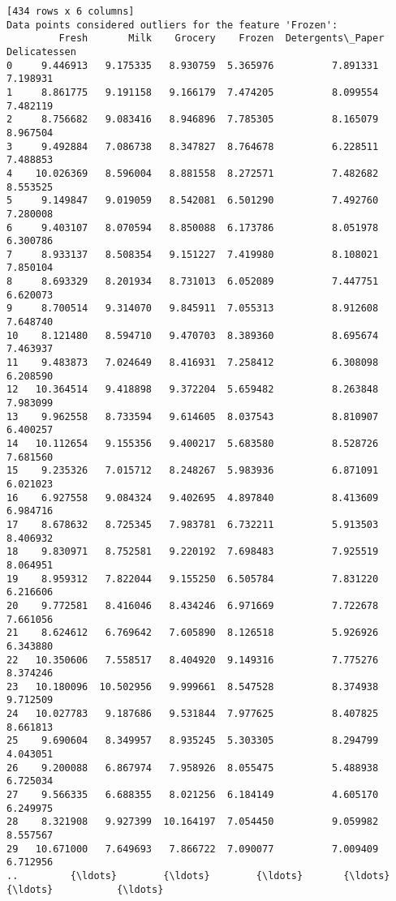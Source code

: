 \documentclass[11pt]{article}
\begin{document}
\begin{Verbatim}[commandchars=\\\{\}]
[434 rows x 6 columns]
Data points considered outliers for the feature 'Frozen':
         Fresh       Milk    Grocery    Frozen  Detergents\_Paper  Delicatessen
0     9.446913   9.175335   8.930759  5.365976          7.891331      7.198931
1     8.861775   9.191158   9.166179  7.474205          8.099554      7.482119
2     8.756682   9.083416   8.946896  7.785305          8.165079      8.967504
3     9.492884   7.086738   8.347827  8.764678          6.228511      7.488853
4    10.026369   8.596004   8.881558  8.272571          7.482682      8.553525
5     9.149847   9.019059   8.542081  6.501290          7.492760      7.280008
6     9.403107   8.070594   8.850088  6.173786          8.051978      6.300786
7     8.933137   8.508354   9.151227  7.419980          8.108021      7.850104
8     8.693329   8.201934   8.731013  6.052089          7.447751      6.620073
9     8.700514   9.314070   9.845911  7.055313          8.912608      7.648740
10    8.121480   8.594710   9.470703  8.389360          8.695674      7.463937
11    9.483873   7.024649   8.416931  7.258412          6.308098      6.208590
12   10.364514   9.418898   9.372204  5.659482          8.263848      7.983099
13    9.962558   8.733594   9.614605  8.037543          8.810907      6.400257
14   10.112654   9.155356   9.400217  5.683580          8.528726      7.681560
15    9.235326   7.015712   8.248267  5.983936          6.871091      6.021023
16    6.927558   9.084324   9.402695  4.897840          8.413609      6.984716
17    8.678632   8.725345   7.983781  6.732211          5.913503      8.406932
18    9.830971   8.752581   9.220192  7.698483          7.925519      8.064951
19    8.959312   7.822044   9.155250  6.505784          7.831220      6.216606
20    9.772581   8.416046   8.434246  6.971669          7.722678      7.661056
21    8.624612   6.769642   7.605890  8.126518          5.926926      6.343880
22   10.350606   7.558517   8.404920  9.149316          7.775276      8.374246
23   10.180096  10.502956   9.999661  8.547528          8.374938      9.712509
24   10.027783   9.187686   9.531844  7.977625          8.407825      8.661813
25    9.690604   8.349957   8.935245  5.303305          8.294799      4.043051
26    9.200088   6.867974   7.958926  8.055475          5.488938      6.725034
27    9.566335   6.688355   8.021256  6.184149          4.605170      6.249975
28    8.321908   9.927399  10.164197  7.054450          9.059982      8.557567
29   10.671000   7.649693   7.866722  7.090077          7.009409      6.712956
..         {\ldots}        {\ldots}        {\ldots}       {\ldots}               {\ldots}           {\ldots}

\end{Verbatim}
\end{document}
